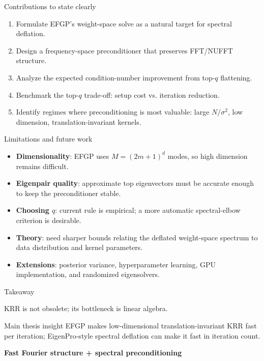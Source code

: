 \documentclass[aspectratio=169,10pt]{beamer}
\begin{document}
\begin{frame}{Contributions to state clearly}
\begin{enumerate}
  \item Formulate EFGP's weight-space solve as a natural target for spectral deflation.
  \item Design a frequency-space preconditioner that preserves FFT/NUFFT structure.
  \item Analyze the expected condition-number improvement from top-$q$ flattening.
  \item Benchmark the top-$q$ trade-off: setup cost vs. iteration reduction.
  \item Identify regimes where preconditioning is most valuable: large $N/\sigma^2$, low dimension, translation-invariant kernels.
\end{enumerate}
\end{frame}

\begin{frame}{Limitations and future work}
\begin{itemize}
  \item \textbf{Dimensionality}: EFGP uses $M=(2m+1)^d$ modes, so high dimension remains difficult.
  \item \textbf{Eigenpair quality}: approximate top eigenvectors must be accurate enough to keep the preconditioner stable.
  \item \textbf{Choosing $q$}: current rule is empirical; a more automatic spectral-elbow criterion is desirable.
  \item \textbf{Theory}: need sharper bounds relating the deflated weight-space spectrum to data distribution and kernel parameters.
  \item \textbf{Extensions}: posterior variance, hyperparameter learning, GPU implementation, and randomized eigensolvers.
\end{itemize}
\end{frame}

\begin{frame}{Takeaway}
\begin{center}
\Large
KRR is not obsolete; its bottleneck is linear algebra.
\end{center}

\vspace{1em}
\begin{block}{Main thesis insight}
EFGP makes low-dimensional translation-invariant KRR fast per iteration; EigenPro-style spectral deflation can make it fast in iteration count.
\end{block}

\vspace{0.5em}
\begin{center}
\Large
\textbf{Fast Fourier structure + spectral preconditioning}
\end{center}
\end{frame}
\end{document}
